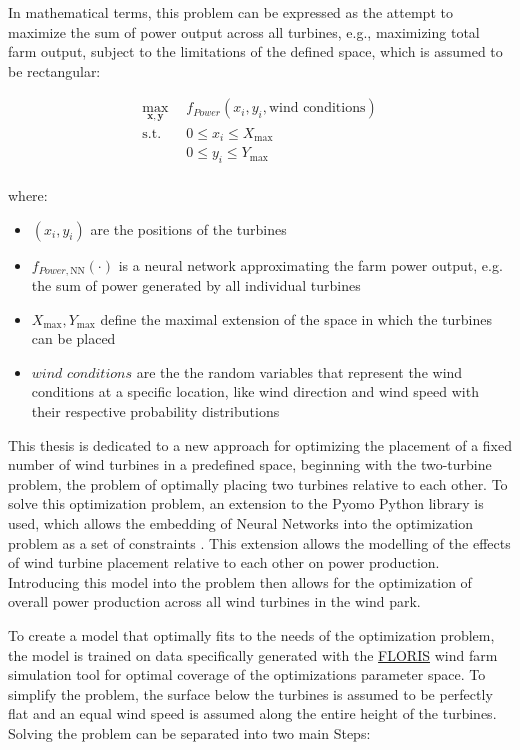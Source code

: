 In mathematical terms, this problem can be expressed as the attempt to maximize the sum of power output across all turbines, e.g., maximizing total farm output, subject to the limitations of the defined space, which is assumed to be rectangular: 

\begin{align}
	\max_{\mathbf{x}, \mathbf{y}} & f_{Power}(x_i, y_i, \text{wind conditions}) \\
	\text{s.t.} \quad 
	&  0 \leq x_i \leq X_{\max} \\
	&  0 \leq y_i \leq Y_{\max} \\
\end{align}

where:
\begin{itemize}
	\item \( (x_i,  y_i) \) are the positions of the turbines
	\item \( f_{Power, \text{NN}}(\cdot)\) is a neural network approximating the farm power output, e.g. the sum of power generated by all individual turbines
	\item \(  X_{\max}, Y_{\max} \) define the maximal extension of the space in which the turbines can be placed
	\item \(\textit{wind conditions}\) are the the random variables that represent the wind conditions at a specific location, like wind direction and wind speed with their respective probability distributions 
\end{itemize}


This thesis is dedicated to a new approach for optimizing the placement of a fixed number of wind turbines in a predefined space, beginning with the two-turbine problem, the problem of optimally placing two turbines relative to each other. To solve this optimization problem, an extension to the Pyomo Python library is used, which allows the embedding of Neural Networks into the optimization problem as a set of constraints \cite{ALCANTARA2023120895}. This extension allows the modelling of the effects of wind turbine placement relative to each other on power production. Introducing this model into the problem then allows for the optimization of overall power production across all wind turbines in the wind park.

To create a model that optimally fits to the needs of the optimization problem, the model is trained on data specifically generated with the \href{https://www.nrel.gov/wind/floris.html}{FLORIS} \cite{nrel_floris} wind farm simulation tool  for optimal coverage of the optimizations parameter space. To simplify the problem, the surface below the turbines is assumed to be perfectly flat and an equal wind speed is assumed along the entire height of the turbines. Solving the problem can be separated into two main Steps:

